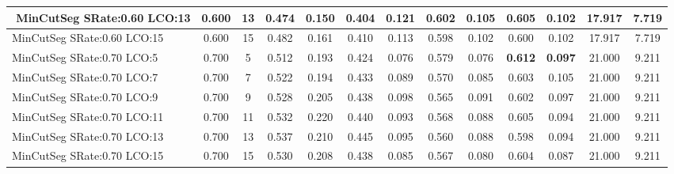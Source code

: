 \documentclass{article}
\begin{document}
\begin{longtable}[c]{|l|c|c|c|c|c|c|c|c|c|c|c|c|}
$$ MinCutSeg SRate:0.60 LCO:13 & 0.600 & 13 & 0.474 & 0.150 & 0.404 & 0.121 & 0.602 & 0.105 & 0.605 & 0.102 & 17.917 & 7.719  \\ \hline 
 MinCutSeg SRate:0.60 LCO:15 & 0.600 & 15 & 0.482 & 0.161 & 0.410 & 0.113 & 0.598 & 0.102 & 0.600 & 0.102 & 17.917 & 7.719  \\ \hline 
 MinCutSeg SRate:0.70 LCO:5 & 0.700 & 5 & 0.512 & 0.193 & 0.424 & 0.076 & 0.579 & 0.076 & \cellcolor{gray!20} \textbf{0.612} & \cellcolor{gray!20} \textbf{0.097} & 21.000 & 9.211  \\ \hline 
 MinCutSeg SRate:0.70 LCO:7 & 0.700 & 7 & 0.522 & 0.194 & 0.433 & 0.089 & 0.570 & 0.085 & 0.603 & 0.105 & 21.000 & 9.211  \\ \hline 
 MinCutSeg SRate:0.70 LCO:9 & 0.700 & 9 & 0.528 & 0.205 & 0.438 & 0.098 & 0.565 & 0.091 & 0.602 & 0.097 & 21.000 & 9.211  \\ \hline 
 MinCutSeg SRate:0.70 LCO:11 & 0.700 & 11 & 0.532 & 0.220 & 0.440 & 0.093 & 0.568 & 0.088 & 0.605 & 0.094 & 21.000 & 9.211  \\ \hline 
 MinCutSeg SRate:0.70 LCO:13 & 0.700 & 13 & 0.537 & 0.210 & 0.445 & 0.095 & 0.560 & 0.088 & 0.598 & 0.094 & 21.000 & 9.211  \\ \hline 
 MinCutSeg SRate:0.70 LCO:15 & 0.700 & 15 & 0.530 & 0.208 & 0.438 & 0.085 & 0.567 & 0.080 & 0.604 & 0.087 & 21.000 & 9.211  \\ \hline 
 \end{longtable} 
\newpage
\end{document}
